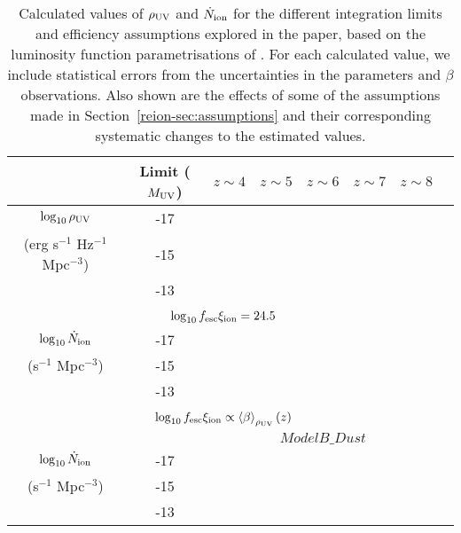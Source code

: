 \begin{table}
\caption{Calculated values of $\rho_{\rm{UV}}$ and $\dot{N}_{\rm{ion}}$ for the different integration limits and efficiency assumptions explored in the paper, based on the luminosity function parametrisations of \citet{Finkelstein:2014ub}. For each calculated value, we include statistical errors from the uncertainties in the \citet{Schechter:1976gl} parameters and $\beta$ observations. Also shown are the effects of some of the assumptions made in Section~\ref{reion-sec:assumptions} and their corresponding systematic changes to the estimated values.}
\scriptsize
  \begin{tabular}{cc|cccccc}
   \hline
   & Limit ($M_{\rm{UV}}$) & $z\sim4$ & $z\sim5$ & $z\sim6$ & $z\sim7$ & $z\sim8$ \\
   \hline
  $\log_{10} \rho_{\rm{UV}}$ 							& -17 &  \\
   (erg s$^{-1}$ Hz$^{-1}$ Mpc$^{-3}$)	& -15 &  \\
																& -13 &  \\

	 \multicolumn{7}{c}{}\\
	 \multicolumn{7}{c}{$\log_{10}f_{\rm{esc}}\xi_{\rm{ion}} = 24.5$}\\\hline
$\log_{10} \dot{N}_{\rm{ion}}$	 		& -17 &  \\
(s$^{-1}$ Mpc$^{-3}$) 				& -15 &  \\
												& -13 &  \\
												
	 \multicolumn{7}{c}{}\\
	 \multicolumn{7}{c}{$\log_{10}f_{\rm{esc}}\xi_{\rm{ion}} \propto \left \langle \beta  \right \rangle_{\rho_{\rm{UV}}}(z)$}\\ \hline
	
	  & & \multicolumn{5}{c}{$ModelB\_Dust$}\\
	  
$\log_{10} \dot{N}_{\rm{ion}}$	 		& -17 &  \\
(s$^{-1}$ Mpc$^{-3}$) 				& -15 &  \\
												& -13 &  \\
												

\end{tabular}
\end{table}
